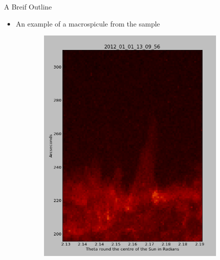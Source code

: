 \documentclass{beamer}
\begin{document}
	\begin{frame}{A Breif Outline}
		\begin{itemize}
			\item An example of a macrospicule from the sample
		\end{itemize}
	\begin{figure}
		\begin{center}
			\begin{subfigure}[b]{0.3\textwidth}
				\begin{center}
					\includegraphics[width=\textwidth]{Figs/example_ms.png}
				\end{center}
			\end{subfigure}
			\begin{subfigure}[b]{0.495\textwidth}			
				\begin{center}

\end{center}
\end{subfigure}
\end{center}
\end{figure}
\end{frame}
\end{document}
